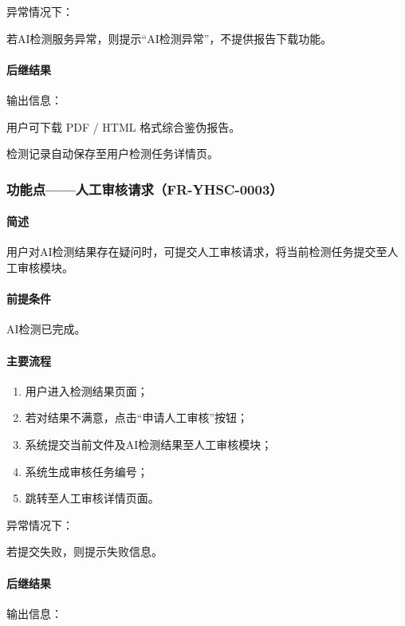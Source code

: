 异常情况下：

若AI检测服务异常，则提示“AI检测异常”，不提供报告下载功能。

\paragraph*{后继结果}

输出信息：

用户可下载 PDF / HTML 格式综合鉴伪报告。

检测记录自动保存至用户检测任务详情页。

\subsubsection{功能点——人工审核请求（FR-YHSC-0003）}

\paragraph*{简述}

用户对AI检测结果存在疑问时，可提交人工审核请求，将当前检测任务提交至人工审核模块。

\paragraph*{前提条件}

AI检测已完成。

\paragraph*{主要流程}

\begin{enumerate}
    \item 用户进入检测结果页面；
    \item 若对结果不满意，点击“申请人工审核”按钮；
    \item 系统提交当前文件及AI检测结果至人工审核模块；
    \item 系统生成审核任务编号；
    \item 跳转至人工审核详情页面。
\end{enumerate}

异常情况下：

若提交失败，则提示失败信息。

\paragraph*{后继结果}

输出信息：

